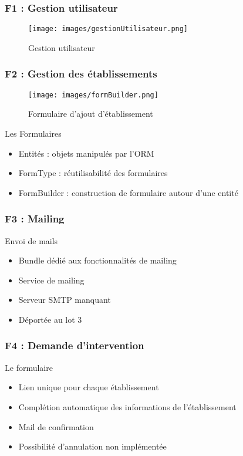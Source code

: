 \speaker{\Florian}

\begin{frame}
\frametitle{F1 : Gestion utilisateur}
      \begin{figure}[h]
	\texttt{[image: images/gestionUtilisateur.png]}
	\caption{Gestion utilisateur}
		  \end{figure}

\end{frame}

\begin{frame}
\frametitle{F2 : Gestion des établissements}
\begin{minipage}[c]{.35\linewidth}
      \begin{figure}[h]
		\texttt{[image: images/formBuilder.png]}
			\caption{\small{Formulaire d'ajout d'établissement}}
	  \end{figure}
   \end{minipage} \hfill
   \begin{minipage}[c]{.4\linewidth}
      \begin{block}{Les Formulaires}
		\begin{itemize}
			\item Entités : objets manipulés par l'ORM
			\item FormType : réutilisabilité des formulaires
			\item FormBuilder : construction de formulaire autour d'une entité
		\end{itemize}
	  \end{block}
   \end{minipage} \hfill
\end{frame}

\begin{frame}
\frametitle{F3 : Mailing}
\begin{block}{Envoi de mails}
	\begin{itemize}
		\item Bundle dédié aux fonctionnalités de mailing
		\item Service de mailing
		\item Serveur SMTP manquant
		\item Déportée au lot 3
	\end{itemize}
\end{block}
\end{frame}

\begin{frame}
\frametitle{F4 : Demande d'intervention}
\begin{block}{Le formulaire}
	\begin{itemize}
		\item Lien unique pour chaque établissement
		\item Complétion automatique des informations de l'établissement
		\item Mail de confirmation
		\item Possibilité d'annulation non implémentée
	\end{itemize}
\end{block}
\end{frame}